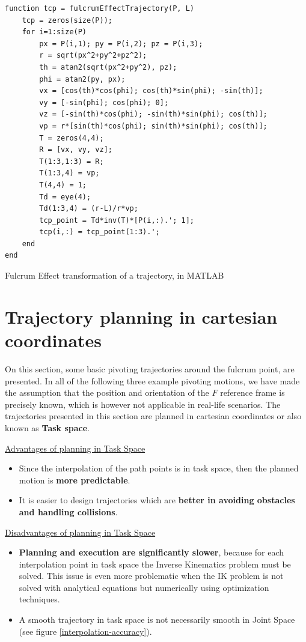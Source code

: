 \begin{listing}[H]
\begin{verbatim}
function tcp = fulcrumEffectTrajectory(P, L)
    tcp = zeros(size(P));
    for i=1:size(P)
        px = P(i,1); py = P(i,2); pz = P(i,3);
        r = sqrt(px^2+py^2+pz^2);
        th = atan2(sqrt(px^2+py^2), pz);
        phi = atan2(py, px);
        vx = [cos(th)*cos(phi); cos(th)*sin(phi); -sin(th)];
        vy = [-sin(phi); cos(phi); 0];
        vz = [-sin(th)*cos(phi); -sin(th)*sin(phi); cos(th)];
        vp = r*[sin(th)*cos(phi); sin(th)*sin(phi); cos(th)];
        T = zeros(4,4);
        R = [vx, vy, vz];
        T(1:3,1:3) = R;
        T(1:3,4) = vp;
        T(4,4) = 1;
        Td = eye(4);
        Td(1:3,4) = (r-L)/r*vp;
        tcp_point = Td*inv(T)*[P(i,:).'; 1];
        tcp(i,:) = tcp_point(1:3).';
    end
end
\end{verbatim}
\caption{Fulcrum Effect transformation of a trajectory, in MATLAB}
\label{code:fulcrum_effect_traj_matlab}
\end{listing}


\section{Trajectory planning in cartesian coordinates}
\label{section:pivot-motions}

On this section, some basic pivoting trajectories around the fulcrum point, are presented. In all of the following three example pivoting motions, we have made 
the assumption that the position and orientation of the ${F}$ reference frame is precisely known, which is however not applicable in real-life scenarios. The trajectories 
presented in this section are planned in cartesian coordinates or also known as \textbf{Task space}.

\underline{Advantages of planning in Task Space}
\begin{itemize}
\item Since the interpolation of the path points is in task space, then the planned motion is \textbf{more predictable}.
\item It is easier to design trajectories which are \textbf{better in avoiding obstacles and handling collisions}.
\end{itemize}

\underline{Disadvantages of planning in Task Space}
\begin{itemize}
\item \textbf{Planning and execution are significantly slower}, because for each interpolation point in task space the Inverse Kinematics problem must be solved. This issue is
even more problematic when the IK problem is not solved with analytical equations but numerically using optimization techniques.
\item A smooth trajectory in task space is not necessarily smooth in Joint Space (see figure \ref{interpolation-accuracy}).
\end{itemize}

